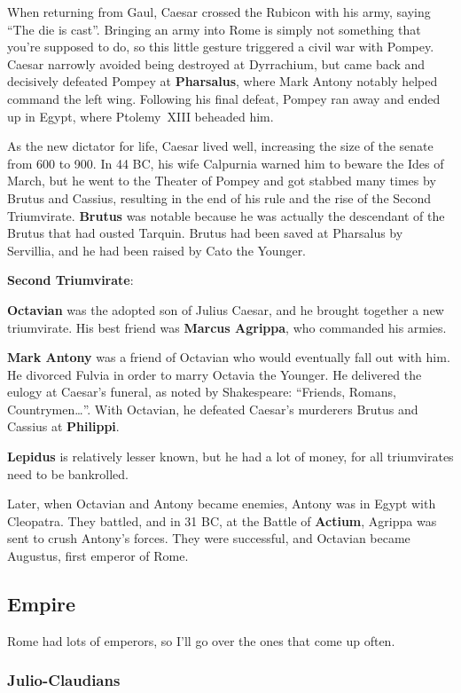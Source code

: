When returning from Gaul, Caesar crossed the Rubicon with his army, saying ``The die is cast''.
Bringing an army into Rome is simply not something that you're supposed to do,
so this little gesture triggered a civil war with Pompey.
Caesar narrowly avoided being destroyed at Dyrrachium,
but came back and decisively defeated Pompey at \textbf{Pharsalus},
where Mark Antony notably helped command the left wing.
Following his final defeat, Pompey ran away and ended up in Egypt, where Ptolemy~XIII beheaded him.

As the new dictator for life, Caesar lived well, increasing the size of the senate from 600 to 900.
In 44 BC, his wife Calpurnia warned him to beware the Ides of March,
but he went to the Theater of Pompey and got stabbed many times by Brutus and Cassius,
resulting in the end of his rule and the rise of the Second Triumvirate.
\textbf{Brutus} was notable because he was actually the descendant of the Brutus that had ousted Tarquin.
Brutus had been saved at Pharsalus by Servillia, and he had been raised by Cato the Younger.

\textbf{Second Triumvirate}:

\textbf{Octavian} was the adopted son of Julius Caesar, and he brought together a new triumvirate.
His best friend was \textbf{Marcus Agrippa}, who commanded his armies.

\textbf{Mark Antony} was a friend of Octavian who would eventually fall out with him.
He divorced Fulvia in order to marry Octavia the Younger.
He delivered the eulogy at Caesar's funeral, as noted by Shakespeare:
``Friends, Romans, Countrymen\ldots{}''.
With Octavian, he defeated Caesar's murderers Brutus and Cassius at \textbf{Philippi}.

\textbf{Lepidus} is relatively lesser known, but he had a lot of money,
for all triumvirates need to be bankrolled.

Later, when Octavian and Antony became enemies, Antony was in Egypt with Cleopatra.
They battled, and in 31 BC, at the Battle of \textbf{Actium}, Agrippa was sent to crush Antony's forces.
They were successful, and Octavian became Augustus, first emperor of Rome.

\subsection*{Empire}

Rome had lots of emperors, so I'll go over the ones that come up often.

\subsubsection*{Julio-Claudians}

